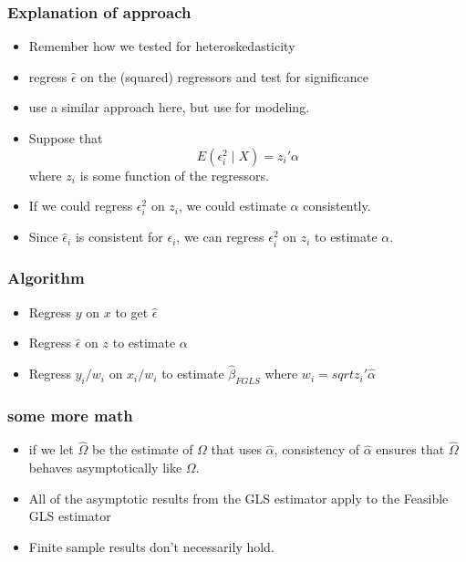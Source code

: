 \documentclass[11pt]{article}
\begin{document}
\subsubsection{Explanation of approach}
\label{sec-3-4-1}

\begin{itemize}
\item Remember how we tested for heteroskedasticity
\item regress $\hat\epsilon$ on the (squared) regressors and test
        for significance
\item use a similar approach here, but use for modeling.
\item Suppose that
        \[ E(\epsilon_i^2 \mid X) = z_i'\alpha \]
        where $z_i$ is some function of the regressors.
\item If we could regress $\epsilon_i^2$ on $z_i$, we could estimate
        $\alpha$ consistently.
\item Since $\hat\epsilon_i$ is consistent for $\epsilon_i$, we can
        regress $\epsilon_i^2$ on $z_i$ to estimate $\alpha$.
\end{itemize}
\subsubsection{Algorithm}
\label{sec-3-4-2}

\begin{itemize}
\item Regress $y$ on $x$ to get $\hat\epsilon$
\item Regress $\hat \epsilon$ on $z$ to estimate $\alpha$
\item Regress $y_i/w_i$ on $x_i/w_i$ to estimate $\hat\beta_{FGLS}$
        where $w_i = sqrt{z_i'\hat\alpha}$
\end{itemize}
\subsubsection{some more math}
\label{sec-3-4-3}

\begin{itemize}
\item if we let $\hat\Omega$ be the estimate of $\Omega$ that uses
        $\hat\alpha$, consistency of $\hat\alpha$ ensures that
        $\hat\Omega$ behaves asymptotically like $\Omega$.
\item All of the asymptotic results from the GLS estimator apply to
        the Feasible GLS estimator
\item Finite sample results don't necessarily hold.
\end{itemize}
\end{document}
